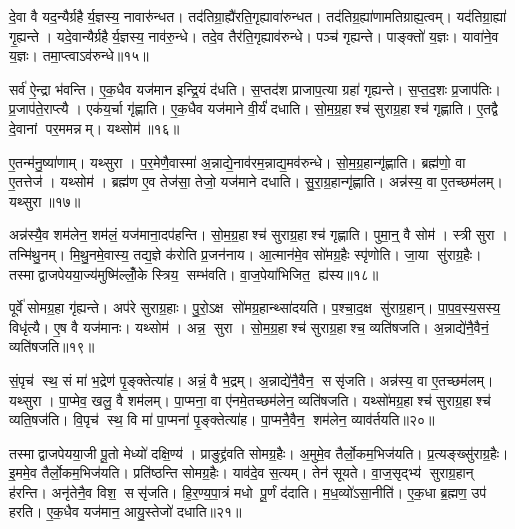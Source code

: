 दे॒वा वै यद॒न्यैर्ग्रहैर्य॒ज्ञस्य॒ नावारु॑न्धत। तद॑तिग्रा॒ह्यै॑रति॒गृह्यावा॑रुन्धत। तद॑तिग्र॒ह्या॑णामतिग्राह्य॒त्वम्। यद॑तिग्रा॒ह्या॑ गृ॒ह्यन्ते। यदे॒वान्यैर्ग्रहैर्य॒ज्ञस्य॒ नाव॑रु॒न्धे। तदे॒व तैर॑ति॒गृह्याव॑रुन्धे। पञ्च॑ गृह्यन्ते। पाङ्क्तो॑ य॒ज्ञः। यावा॑ने॒व य॒ज्ञः। तमा॒प्त्वाऽव॑रुन्धे॥१५॥

सर्व॑ ऐ॒न्द्रा भ॑वन्ति। ए॒क॒धैव यज॑मान इन्द्रि॒यं द॑धति। स॒प्तद॑श प्राजाप॒त्या ग्रहा॑ गृह्यन्ते। स॒प्त॒द॒शः प्र॒जाप॑तिः। प्र॒जाप॑ते॒राप्त्यै। एक॑य॒र्चा गृ॑ह्णाति। ए॒क॒धैव यज॑माने वी॒र्यं॑ दधाति। सो॒म॒ग्र॒हाश्च॑ सुराग्र॒हाश्च॑ गृह्णाति। ए॒तद्वै दे॒वानां पर॒ममन्नम्। यथ्सोम॑॥१६॥

ए॒तन्म॑नु॒ष्या॑णाम्। यथ्सुरा। प॒र॒मेणै॒वास्मा॑ अ॒न्नाद्ये॒नाव॑रम॒न्नाद्य॒मव॑रुन्धे। सो॒म॒ग्र॒हान्गृ॑ह्णाति। ब्रह्म॑णो॒ वा ए॒तत्तेज॑। यथ्सोम॑। ब्रह्म॑ण ए॒व तेज॑सा॒ तेजो॒ यज॑माने दधाति। सु॒रा॒ग्र॒हान्गृ॑ह्णाति। अन्न॑स्य॒ वा ए॒तच्छम॑लम्। यथ्सुरा॥१७॥

अन्न॑स्यै॒व शम॑लेन॒ शम॑लं॒ यज॑माना॒दप॑हन्ति। सो॒म॒ग्र॒हाश्च॑ सुराग्र॒हाश्च॑ गृह्णाति। पुमा॒न्॒ वै सोम॑। स्त्री सुरा। तन्मि॑थु॒नम्। मि॒थु॒नमे॒वास्य॒ तद्य॒ज्ञे क॑रोति प्र॒जन॑नाय। आ॒त्मान॑मे॒व सो॑मग्र॒हैः स्पृ॑णोति। जा॒या सु॑राग्र॒हैः। तस्माद्वाजपेयया॒ज्य॑मुष्मि॑ल्लोँ॒के स्त्रिय॒ सम्भ॑वति। वा॒ज॒पेया॑भिजित॒ ह्य॑स्य॥१८॥

पूर्वे॑ सोमग्र॒हा गृ॑ह्यन्ते। अप॑रे सुराग्र॒हाः। पु॒रो॒ऽक्ष सो॑मग्र॒हान्थ्सा॑दयति। प॒श्चा॒द॒क्ष सु॑राग्र॒हान्। पा॒प॒व॒स्य॒सस्य॒ विधृ॑त्यै। ए॒ष वै यज॑मानः। यथ्सोम॑। अन्न॒ सुरा। सो॒म॒ग्र॒हाश्च॑ सुराग्र॒हाश्च॒ व्यति॑षजति। अ॒न्नाद्ये॑नै॒वैनं॒ व्यति॑षजति॥१९॥

सं॒पृच॑ स्थ॒ सं मा॑ भ॒द्रेण॑ पृ॒ङ्क्तेत्या॑ह। अन्नं॒ वै भ॒द्रम्। अ॒न्नाद्ये॑नै॒वैन॒ ससृ॑जति। अन्न॑स्य॒ वा ए॒तच्छम॑लम्। यथ्सुरा। पा॒प्मेव॒ खलु॒ वै शम॑लम्। पा॒प्मना॒ वा ए॑नमे॒तच्छम॑लेन॒ व्यति॑षजति। यथ्सो॑मग्र॒हाश्च॑ सुराग्र॒हाश्च॑ व्यति॒षज॑ति। वि॒पृच॑ स्थ॒ वि मा॑ पा॒प्मना॑ पृ॒ङ्क्तेत्या॑ह। पा॒प्मनै॒वैन॒ शम॑लेन॒ व्याव॑र्तयति॥२०॥

तस्माद्वाजपेयया॒जी पू॒तो मेध्यो॑ दक्षि॒ण्य॑। प्राङुद्द्र॑वति सोमग्र॒हैः। अ॒मुमे॒व तैर्लो॒कम॒भिज॑यति। प्र॒त्यङ्ख्सु॑राग्र॒हैः। इ॒ममे॒व तैर्लो॒कम॒भिज॑यति। प्रति॑ष्ठन्ति सोमग्र॒हैः। याव॑दे॒व स॒त्यम्। तेन॑ सूयते। वा॒ज॒सृद्भ्य॑ सुराग्र॒हान् ह॑रन्ति। अनृ॑तेनै॒व विश॒ ससृ॑जति। हि॒र॒ण्य॒पा॒त्रं मधोपू॒र्णं द॑दाति। म॒ध॒व्यो॑ऽसा॒नीति॑। ए॒क॒धा ब्र॒ह्मण॒ उप॑ हरति। ए॒क॒धैव यज॑मान॒ आयु॒स्तेजो॑ दधाति॥२१॥

